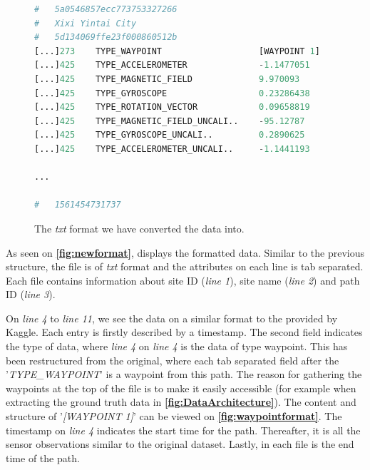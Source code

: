 \begin{figure}[H]
\lstset{numbers=left}
\begin{lstlisting}[language=Python]
#	5a0546857ecc773753327266
#	Xixi Yintai City
#	5d134069ffe23f000860512b
[...]273    TYPE_WAYPOINT                   [WAYPOINT 1]	  [WAYPOINT 2]      ...
[...]425    TYPE_ACCELEROMETER	            -1.1477051      1.6084747	        ...
[...]425    TYPE_MAGNETIC_FIELD	            9.970093        31.666565	        ...
[...]425    TYPE_GYROSCOPE	                0.23286438      -0.18293762	      ...
[...]425    TYPE_ROTATION_VECTOR            0.09658819	    0.061834227       ...
[...]425    TYPE_MAGNETIC_FIELD_UNCALI..    -95.12787	      -39.694214        ...
[...]425    TYPE_GYROSCOPE_UNCALI..	        0.2890625	      -0.26670837       ...
[...]425    TYPE_ACCELEROMETER_UNCALI..	    -1.1441193	    1.7066345         ...

...

#	1561454731737
\end{lstlisting}
\caption{The \textit{txt} format we have converted the data into.}
\label{fig:newformat}
\end{figure}

As seen on \textbf{\autoref{fig:newformat}}, displays the formatted data. Similar to the previous structure, the file is of \textit{txt} format and the attributes on each line is tab separated. Each file contains information about site ID (\textit{line 1}), site name (\textit{line 2}) and path ID (\textit{line 3}).

On \textit{line 4} to \textit{line 11}, we see the data on a similar format to the provided by Kaggle. Each entry is firstly described by a timestamp. The second field indicates the type of data, where \textit{line 4} on \textit{line 4} is the data of type waypoint. This has been restructured from the original, where each tab separated field after the '\textit{TYPE\_WAYPOINT}' is a waypoint from this path. The reason for gathering the waypoints at the top of the file is to make it easily accessible (for example when extracting the ground truth data in \textbf{\autoref{fig:DataArchitecture}}). The content and structure of '\textit{[WAYPOINT 1]}' can be viewed on \textbf{\autoref{fig:waypointformat}}. The timestamp on \textit{line 4} indicates the start time for the path. Thereafter, it is all the sensor observations similar to the original dataset. Lastly, in each file is the end time of the path.

